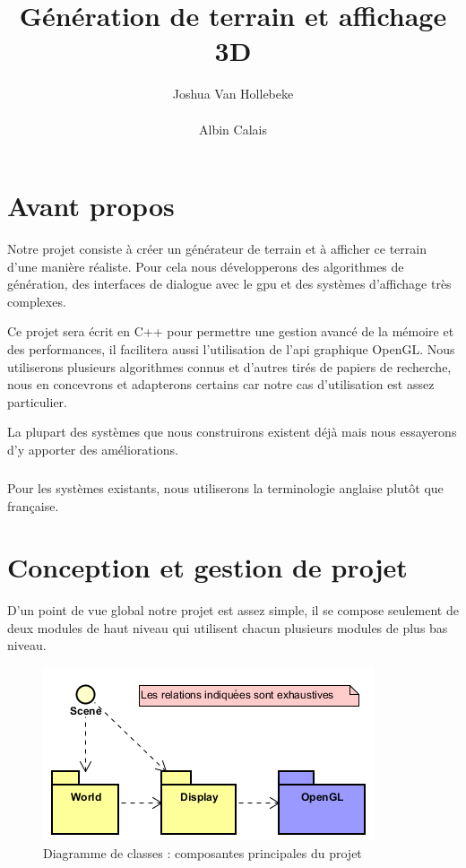 \documentclass{EPUProjetDi}
\title{Génération de terrain et affichage 3D}
\author{
	Joshua Van Hollebeke\\
	\noindent[\url{joshua.van-hollebeke@etu.univ-tours.fr}]\\
	Albin Calais\\
	\noindent[\url{albin.calais@etu.univ-tours.fr}]
}
\begin{document}
\maketitle

\setcounter{page}{0}

{
\setlength{\parskip}{0em}
\tableofcontents
\listoffigures
}

\start




\chapter*{Avant propos} 

Notre projet consiste à créer un générateur de terrain et à afficher ce terrain d'une manière réaliste. Pour cela nous développerons des algorithmes de génération, des interfaces de dialogue avec le gpu et des systèmes d'affichage très complexes.

Ce projet sera écrit en C++ pour permettre une gestion avancé de la mémoire et des performances, il facilitera aussi l'utilisation de l'api graphique OpenGL.
Nous utiliserons plusieurs algorithmes connus et d'autres tirés de papiers de recherche, nous en concevrons et adapterons certains car notre cas d'utilisation est assez particulier.

La plupart des systèmes que nous construirons existent déjà mais nous essayerons d'y apporter des améliorations.

\paragraph{}
Pour les systèmes existants, nous utiliserons la terminologie anglaise plutôt que française.

\chapter{Conception et gestion de projet}

D'un point de vue global notre projet est assez simple, il se compose seulement de deux modules de haut niveau qui utilisent chacun plusieurs modules de plus bas niveau.

\begin{figure}[ht]
	\centering
	\includegraphics[scale=.6]{overview_uml}
	\caption{Diagramme de classes : composantes principales du projet}
\end{figure}
\end{document}
